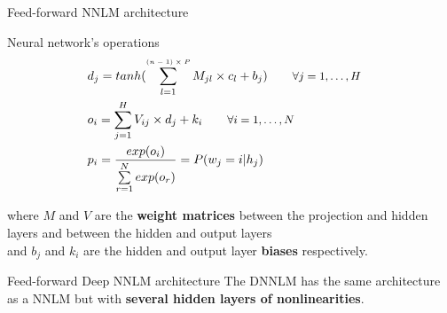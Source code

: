 \documentclass{beamer}
\begin{document}
\begin{frame}{Feed-forward NNLM architecture}

\begin{exampleblock}{Neural network's operations}
\begin{equation}
\left.\begin{aligned}
    &d_j = tanh(\sum\limits_{l=1}^{\text{\tiny{$(n-1) \times P$}}}{M_{jl} \times c_l + b_j}) \qquad \text{\small{$\forall j = 1, \ldots, H$}}&\\
    &o_i = \sum\limits_{j=1}^{H}{V_{ij} \times d_j + k_i} \qquad \text{\small{$\forall i = 1, \ldots, N$}}&\\
    &p_i = \frac{exp(o_i)}{\sum\limits_{r=1}^{N}{exp(o_r)}} = P(w_j = i | h_j)&\\
\end{aligned}\right.
\end{equation}
\end{exampleblock}

where $M$ and $V$ are the \textbf{weight matrices} between the projection and hidden layers and between the hidden and output layers \\and $b_j$ and $k_i$ are the hidden and output layer \textbf{biases} respectively.


\end{frame}

\begin{frame}{Feed-forward Deep NNLM architecture}
	The DNNLM has the same architecture as a NNLM but with \textbf{several hidden layers of nonlinearities}.
\end{frame}
\end{document}
